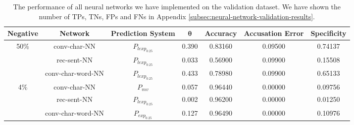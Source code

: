 \begin{table}[h]
    \begin{adjustbox}{center}
    \begin{tabular}{|c|c|c|c|c|c|c|}
        \hline
        \textbf{Negative} & \textbf{Network}  & \textbf{Prediction System} &
        $\mathbf{\theta}$ & \textbf{Accuracy} & \textbf{Accusation Error}  & 
        \textbf{Specificity} \\ \hline
        \multirow{3}{*}{50\%}  & \gls{conv-char-NN}      & $P_{lexp_{0.25}}$ &
        0.390                  & 0.83160                 & 0.09500           &
        0.74137
        \\
        \cline{2-7}            & \gls{rec-sent-NN}       & $P_{lexp_{0.25}}$ &
        0.033                  & 0.56900                 & 0.09900           &
        0.15508
        \\
        \cline{2-7}            & \gls{conv-char-word-NN} & $P_{lexp_{0.25}}$ &
        0.433                  & 0.78980                 & 0.09900           &
        0.65133
        \\ \hline
        \multirow{3}{*}{4\%}   & \gls{conv-char-NN}      & $P_{mv}$          &
        0.057                  & 0.96440                 & 0.00000           &
        0.09756
        \\
        \cline{2-7}            & \gls{rec-sent-NN}       & $P_{lexp_{0.25}}$ &
        0.002                  & 0.96200                 & 0.00000           &
        0.01250
        \\
        \cline{2-7}            & \gls{conv-char-word-NN} & $P_{exp_{0.25}}$  &
        0.127                  & 0.96490                 & 0.00000           &
        0.10976
        \\ \hline
    \end{tabular}
    \end{adjustbox}
    \caption{The performance of all neural networks we have implemented on the
        validation dataset. We have shown the number of \glspl{TP}, \glspl{TN},
        \glspl{FP} and \glspl{FN} in Appendix
        \ref{subsec:neural-network-validation-results}.}
    \label{tab:experiment-validation-results}
\end{table}
